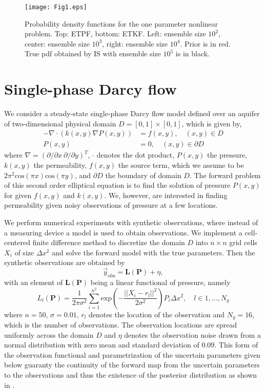 \documentclass[12, a4paper]{article}
\numberwithin{equation}{section}
\begin{document}
\begin{figure}[t]
	\centering
	\texttt{[image: Fig1.eps]}
	\caption{Probability density functions for the one parameter nonlinear problem. Top: ETPF, bottom: ETKF. Left: ensemble size $10^2$, center: ensemble size $10^3$, right: ensemble size $10^4$. Prior is in red. True pdf obtained by IS with ensemble size $10^5$ is in black.}
	\label{Fig_1Dpdf}
\end{figure}


\section{Single-phase Darcy flow} \label{Sec:Darcy}

We consider a steady-state single-phase Darcy flow model defined over an aquifer of two-dimensional physical domain  $D = [0,1] \times [0,1] $, which is given by,
\begin{align*} 
-\nabla \cdot (k(x,y)\nabla P(x,y)) & =f(x,y),   \quad  (x,y)\in D  \\
P(x,y) & =0, \quad  (x,y) \in \partial D 
\end{align*} 
where $\nabla = ( \partial / \partial x \ \partial / \partial y)^T$, $\cdot$ denotes the dot product, $P(x,y)$  the pressure, $k(x,y)$ the permeability, $f(x,y)$  the source term, which we assume to be $2\pi^2 \text{cos}(\pi x) \text{cos}(\pi y)$, and $\partial D$  the boundary of domain $D$.  The forward problem of this second order elliptical equation is to find the solution of pressure $P(x,y)$ for given $f(x,y)$ and $k(x,y)$. We, however, are interested in finding permeability given noisy observations of pressure at a few locations. 

We perform numerical experiments with synthetic observations, where instead of a measuring device a model is used to obtain observations. We implement a cell-centered finite difference method to discretize the domain $D$ into $n\times n$ grid cells $X_i$ of size $\Delta x^2$ and solve the forward model with the true parameters. Then the synthetic observations are obtained by
\begin{equation*} 
\vec{y}_{\text{obs}} = \textbf{L}(\textbf{P}) + \eta,              
\end{equation*}
with an element of $\textbf{L}(\textbf{P})$ being a linear functional of pressure, namely
\begin{equation*}
L_l(\textbf{P}) = \frac{1}{2 \pi \sigma ^2} \sum_{i=1}^{n^2} \text{exp} \left(-\frac{||X_{i}-r_l ||^2}{2 \sigma^2}\right) P_{i} \Delta x^2, \quad l\in 1, \dots,N_y
\end{equation*}
where $n=50$, $\sigma = 0.01$, ${r}_l$ denotes the location of the observation and $N_y=16$, which is the number of observations. The observation locations are spread uniformly across the domain $D$ and $\eta$ denotes the observation noise drawn from a normal distribution with zero mean and standard deviation of $0.09$. This form of the observation functional and parametrization of the uncertain parameters given below guaranty the continuity of the forward map from the uncertain parameters to the observations and thus the existence of the posterior distribution as shown in \cite{Igetal14}. 
\end{document}

